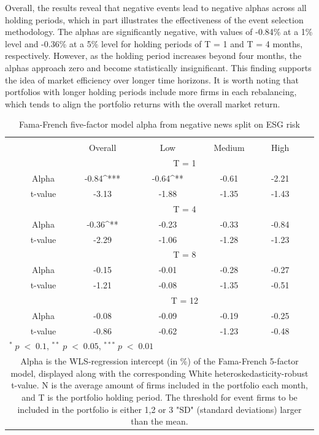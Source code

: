 Overall, the results reveal that negative events lead to negative alphas across all holding periods, which in part illustrates the effectiveness of the event selection methodology. The alphas are significantly negative, with values of -0.84\% at a 1\% level and -0.36\% at a 5\% level for holding periods of T = 1 and T = 4 months, respectively. However, as the holding period increases beyond four months, the alphas approach zero and become statistically insignificant. This finding supports the idea of market efficiency over longer time horizons. It is worth noting that portfolios with longer holding periods include more firms in each rebalancing, which tends to align the portfolio returns with the overall market return. 

\setlength{\tabcolsep}{15pt}
\begin{table}[H]
\small
\centering
\caption{Fama-French five-factor model alpha from negative news split on ESG risk} 
\begin{tabular}{ccccccc}
\hline \hline \\ 
 &     & Overall &    Low  &  Medium  &  High &  \\    \cline{3-6} 
& &  \multicolumn{4}{c}{ T = 1} & \\ \cline{2-6}
& Alpha    & -0.84^{***} & -0.64^{**}  & -0.61  & -2.21 &  \\ 
& t-value   & -3.13 & -1.88 & -1.35  & -1.43 &  \\
& &  \multicolumn{4}{c}{ T = 4} & \\ \cline{2-6}
& Alpha    & -0.36^{**} & -0.23  & -0.33  &  -0.84 & \\
& t-value &   -2.29 & -1.06 & -1.28  & -1.23 & \\
& &  \multicolumn{4}{c}{ T = 8} & \\ \cline{2-6}
& Alpha     & -0.15 & -0.01   & -0.28  & -0.27 &  \\
& t-value &   -1.21 & -0.08  & -1.35 & -0.51 &  \\
& &  \multicolumn{4}{c}{ T = 12} & \\ \cline{2-6}
& Alpha     & -0.08 & -0.09  & -0.19  & -0.25 &  \\
& t-value &    -0.86 & -0.62  & -1.23 & -0.48 &  \\
\hline \hline
 \multicolumn{7}{l}{ \footnotesize $^* \; p\; <\; 0.1$, $ ^{**} \; p\; <\; 0.05$, $ ^{***} \; p\; <\; 0.01$  } \\
 \multicolumn{7}{p{12cm}}{ \footnotesize Alpha is the WLS-regression intercept (in \%) of the Fama-French 5-factor model, displayed along with the corresponding White heteroskedasticity-robust t-value. N is the average amount of firms included in the portfolio each month, and T is the portfolio holding period. The threshold for event firms to be included in the portfolio is either 1,2 or 3 "SD" (standard deviations) larger than the mean.} \\ 
 \hline
\end{tabular}
\label{tab: FF5_neg_ESG}
\end{table}


